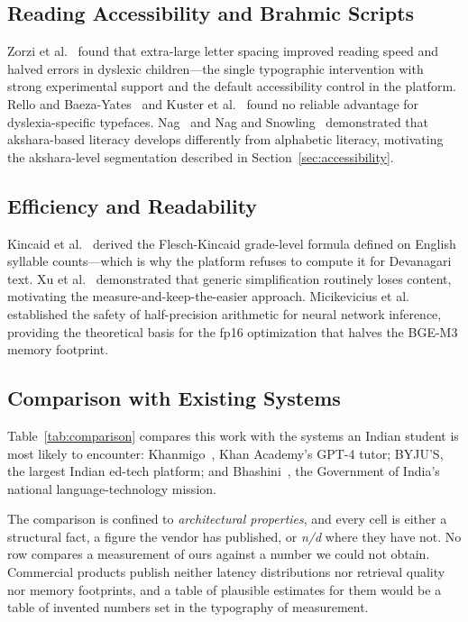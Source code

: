 \documentclass[conference]{IEEEtran}
\begin{document}
\subsection{Reading Accessibility and Brahmic Scripts}
Zorzi et al.~\cite{b13} found that extra-large letter spacing improved reading speed and halved errors in dyslexic children---the single typographic intervention with strong experimental support and the default accessibility control in the platform. Rello and Baeza-Yates~\cite{b14} and Kuster et al.~\cite{b15} found no reliable advantage for dyslexia-specific typefaces. Nag~\cite{b16} and Nag and Snowling~\cite{b17} demonstrated that akshara-based literacy develops differently from alphabetic literacy, motivating the akshara-level segmentation described in Section~\ref{sec:accessibility}.

\subsection{Efficiency and Readability}
Kincaid et al.~\cite{b18} derived the Flesch-Kincaid grade-level formula defined on English syllable counts---which is why the platform refuses to compute it for Devanagari text. Xu et al.~\cite{b19} demonstrated that generic simplification routinely loses content, motivating the measure-and-keep-the-easier approach. Micikevicius et al.~\cite{b20} established the safety of half-precision arithmetic for neural network inference, providing the theoretical basis for the fp16 optimization that halves the BGE-M3 memory footprint.

\subsection{Comparison with Existing Systems}
\label{sec:comparison}
Table~\ref{tab:comparison} compares this work with the systems an Indian student is most likely to encounter: Khanmigo~\cite{b21}, Khan Academy's GPT-4 tutor; BYJU'S, the largest Indian ed-tech platform; and Bhashini~\cite{b22}, the Government of India's national language-technology mission.

The comparison is confined to \emph{architectural properties}, and every cell is either a structural fact, a figure the vendor has published, or \emph{n/d} where they have not. No row compares a measurement of ours against a number we could not obtain. Commercial products publish neither latency distributions nor retrieval quality nor memory footprints, and a table of plausible estimates for them would be a table of invented numbers set in the typography of measurement.
\end{document}
